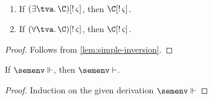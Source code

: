 \documentclass[acmsmall,screen,nonacm,review]{acmart}
\begin{document}
\begin{lemma}
  \label{lem:unicity-inversion}~
  \begin{enumerate}[(\roman*)]
    \item If $\Cshape {\parens{\cexists \tv \C}} \t \sh$, then $\Cshape \C \t \sh$.
    \item If $\Cshape {\parens{\cfor \tv \C}} \t \sh$, then $\Cshape \C \t \sh$.
  \end{enumerate}
  \begin{proof}
    Follows from \cref{lem:simple-inversion}.
  \end{proof}
\end{lemma}

\begin{lemma}[Decanonicalization]
  \label{lem:decanonicalization}
  If $\semenv \Th \c$, then $\semenv \th \c$.
  \begin{proof}
    Induction on the given derivation $\semenv \Th \c$
  \end{proof}
\end{lemma}
\end{document}
